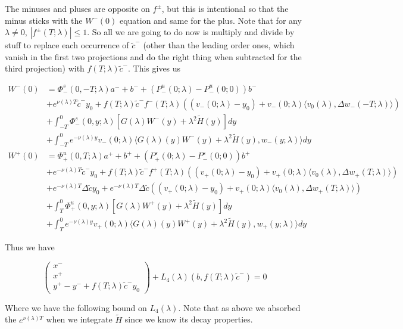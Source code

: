 \documentclass[12pt]{article}
\begin{document}
\begin{enumerate}
The minuses and pluses are opposite on $f^\pm$, but this is intentional so that the minus sticks with the $W^-(0)$ equation and same for the plus. Note that for any $\lambda \neq 0$, $|f^\pm(T; \lambda)| \leq 1$. So all we are going to do now is multiply and divide by stuff to replace each occurrence of $\tilde{c}^-$ (other than the leading order ones, which vanish in the first two projections and do the right thing when subtracted for the third projection) with $f(T; \lambda) \tilde{c}^-$. This gives us

\begin{align*}
W^-(0) &= \Phi^s_-(0, -T; \lambda )a^- + b^- + (P^u_-(0; \lambda) - P^u_-(0; 0))b^- \\
&+ e^{\nu(\lambda)T} \tilde{c}^- y_0 + f(T; \lambda) \tilde{c}^- f^-(T; \lambda) ( (v_-(0; \lambda) - y_0) + v_-(0; \lambda) \langle  v_0(\lambda), \Delta w_-(-T; \lambda) \rangle) \\
&+ \int_{-T}^0 \Phi^s_-(0, y; \lambda) [ G(\lambda)W^-(y) + \lambda^2 \tilde{H}(y) ] dy \\
&+ \int_{-T}^0 
e^{-\nu(\lambda)y} v_-(0; \lambda) \langle G(\lambda)(y)W^-(y) + \lambda^2 \tilde{H}(y), w_-(y; \lambda) \rangle dy \\
W^+(0) &= \Phi^u_+(0, T; \lambda)a^+ + b^+ + (P^s_+(0; \lambda) - P^s_-(0; 0))b^+ \\
&+ e^{-\nu(\lambda)T} \tilde{c}^- y_0 + f(T; \lambda) \tilde{c}^- f^+(T; \lambda) ( (v_+(0; \lambda) - y_0) + v_+(0; \lambda) \langle  v_0(\lambda), \Delta w_+(T; \lambda) \rangle) \\
&+ e^{-\nu(\lambda)T} \Delta \tilde{c} y_0 + e^{-\nu(\lambda)T} \Delta \tilde{c} ( (v_+(0; \lambda) - y_0) + v_+(0; \lambda) \langle  v_0(\lambda), \Delta w_+(T; \lambda) \rangle) \\
&+ \int_T^0 \Phi^u_+(0, y; \lambda) [ G(\lambda)W^+(y) + \lambda^2 \tilde{H}(y) ] dy \\
&+ \int_T^0 e^{-\nu(\lambda)y} v_+(0; \lambda) \langle G(\lambda)(y)W^+(y) + \lambda^2 \tilde{H}(y), w_+(y; \lambda) \rangle dy
\end{align*}

Thus we have

\[
\begin{pmatrix}x^- \\ x^+ \\ y^+ - y^- + f(T; \lambda) \tilde{c}^- y_0 \end{pmatrix} + L_4(\lambda)(b, f(T; \lambda) \tilde{c}^-) = 0
\]

Where we have the following bound on $L_4(\lambda)$. Note that as above we absorbed the $e^{\nu(\lambda)T}$ when we integrate $\tilde{H}$ since we know its decay properties.


\end{enumerate}
\end{document}

